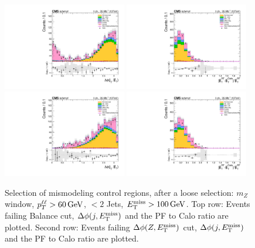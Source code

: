 \begin{figure}[hbtp]
  \centering
  \includegraphics[width=0.48\textwidth]{figures/ll_metCheck_dPhiJetMet_failBalance.pdf}
  \includegraphics[width=0.48\textwidth]{figures/ll_metCheck_pfVsCaloMet_failBalance.pdf}
  \includegraphics[width=0.48\textwidth]{figures/ll_metCheck_dPhiJetMet_failDphi.pdf}
  \includegraphics[width=0.48\textwidth]{figures/ll_metCheck_pfVsCaloMet_failDphi.pdf}
  \caption{
    Selection of \met mismodeling control regions, after a loose selection: $m_Z$ window, $p_{T}^{\ell\ell}>60\,\text{Ge\hspace{-.08em}V}$, $<2$ Jets, $E_\mathrm{T}^{\mathrm{miss}}>100\,\text{Ge\hspace{-.08em}V}$.
    Top row: Events failing \met Balance cut, $\Delta\phi(j,E_\mathrm{T}^{\mathrm{miss}})$ and the PF to Calo \met ratio are plotted.
    Second row: Events failing $\Delta\phi(Z,E_\mathrm{T}^{\mathrm{miss}})$ cut, $\Delta\phi(j,E_\mathrm{T}^{\mathrm{miss}})$ and the PF to Calo \met ratio are plotted.
  }
  \label{fig:met_control}
\end{figure}

